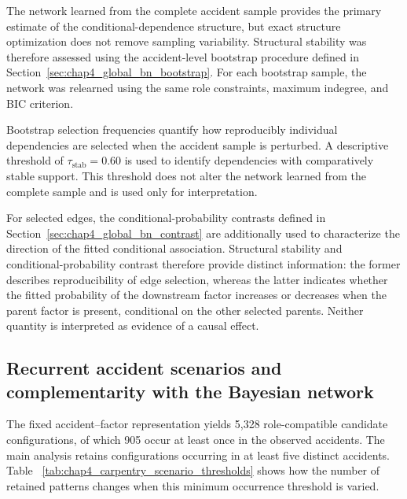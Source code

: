 The network learned from the complete accident sample provides the primary
estimate of the conditional-dependence structure, but exact structure
optimization does not remove sampling variability. Structural stability was
therefore assessed using the accident-level bootstrap procedure defined in
Section~\ref{sec:chap4_global_bn_bootstrap}. For each bootstrap sample, the
network was relearned using the same role constraints, maximum indegree, and
BIC criterion.

Bootstrap selection frequencies quantify how reproducibly individual
dependencies are selected when the accident sample is perturbed. A
descriptive threshold of
\(\tau_{\mathrm{stab}}=0.60\)
is used to identify dependencies with comparatively stable support. This
threshold does not alter the network learned from the complete sample and is
used only for interpretation.

For selected edges, the conditional-probability contrasts defined in
Section~\ref{sec:chap4_global_bn_contrast} are additionally used to
characterize the direction of the fitted conditional association. Structural
stability and conditional-probability contrast therefore provide distinct
information: the former describes reproducibility of edge selection, whereas
the latter indicates whether the fitted probability of the downstream factor
increases or decreases when the parent factor is present, conditional on the
other selected parents. Neither quantity is interpreted as evidence of a
causal effect.


\subsection{Recurrent accident scenarios and complementarity with the Bayesian network}
\label{sec:chap4_carpentry_scenarios}

The fixed accident--factor representation yields 5,328 role-compatible
candidate configurations, of which 905 occur at least once in the observed
accidents. The main analysis retains configurations occurring in at least five
distinct accidents. Table~
\ref{tab:chap4_carpentry_scenario_thresholds} shows how the number of retained
patterns changes when this minimum occurrence threshold is varied.

